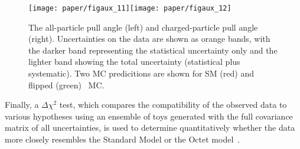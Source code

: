 







\begin{figure}[h!]
\begin{center}
\texttt{[image: paper/figaux\_11]}\texttt{[image: paper/figaux\_12]}
 \caption{The all-particle pull angle (left) and charged-particle pull angle (right).
    Uncertainties on the data are shown as orange bands, with the darker band
    representing the statistical uncertainty only and the lighter band
    showing the total uncertainty (statistical plus systematic). Two MC predicitions
    are shown for SM (red) and flipped (green) \PowPythia\ MC.}
 \label{fig:color:unfolding:final}
  \end{center}
\end{figure}

\FloatBarrier

Finally, a $\Delta \chi^2$ test, which compares the compatibility of the observed data to various hypotheses using an ensemble of toys generated with the full covariance matrix of all uncertainties, is used to determine quantitatively whether the data more closely resembles the Standard Model or the Octet model~\cite{Nachman:1728288}.

